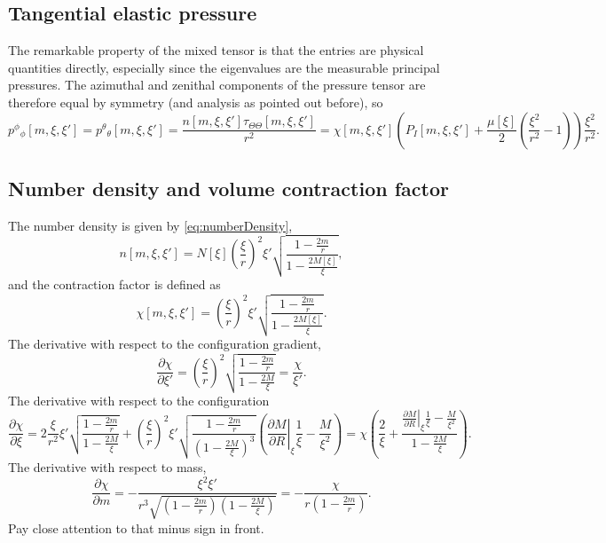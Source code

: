 \subsection{Tangential elastic pressure}
The remarkable property of the mixed tensor is that the entries are physical quantities directly, especially since the eigenvalues are the measurable principal pressures. The azimuthal and zenithal components of the pressure tensor are therefore equal by symmetry (and analysis as pointed out before), so
\begin{equation}
p^\phi{}_\phi[m,\xi,\xi'] = p^\theta{}_\theta[m,\xi,\xi'] = \frac{n[m,\xi,\xi']\tau_{\Theta\Theta}[m,\xi,\xi']}{r^2} = \chi[m,\xi,\xi']\left(P_I[m,\xi,\xi'] + \frac{\mu[\xi]}{2} \left(\frac{\xi^2}{r^2} - 1\right) \right) \frac{\xi^2}{r^2}.
\label{eq:tangentialPressureExpanded}
\end{equation}

\subsection{Number density and volume contraction factor}
The number density is given by \eqref{eq:numberDensity},
\begin{equation}
n[m,\xi,\xi'] = N[\xi]\left(\frac{\xi}{r}\right)^2\xi'\sqrt{\frac{1-\frac{2m}{r}}{1-\frac{2M[\xi]}{\xi}}},
\label{eq:numberDensityExpanded}
\end{equation}
and the contraction factor is defined as
\begin{equation}
\chi[m,\xi,\xi'] = \left(\frac{\xi}{r}\right)^2\xi'\sqrt{\frac{1-\frac{2m}{r}}{1-\frac{2M[\xi]}{\xi}}}.
\label{eq:contractionFactorExpanded}
\end{equation}
The derivative with respect to the configuration gradient,
\begin{equation}
\frac{\partial \chi}{\partial \xi'} = \left(\frac{\xi}{r}\right)^2\sqrt{\frac{1-\frac{2m}{r}}{1-\frac{2M}{\xi}}} = \frac{\chi}{\xi'}.
\label{eq:dcontractionFactor:dxi}
\end{equation}
The derivative with respect to the configuration
\begin{equation}
\frac{\partial \chi}{\partial \xi} =  2\frac{\xi}{r^2}\xi'\sqrt{\frac{1-\frac{2m}{r}}{1-\frac{2M}{\xi}}} + \left(\frac{\xi}{r}\right)^2\xi'\sqrt{\frac{1-\frac{2m}{r}}{\left(1-\frac{2M}{\xi}\right)^3}} \left(\left.\frac{\partial M}{\partial R}\right|_\xi\frac{1}{\xi} - \frac{M}{\xi^2}\right) = \chi\left(\frac{2}{\xi} + \frac{\left.\frac{\partial M}{\partial R}\right|_\xi\frac{1}{\xi} - \frac{M}{\xi^2}}{1 - \frac{2M}{\xi}}\right).
\label{eq:dcontractionFactor:xi}
\end{equation}
The derivative with respect to mass,
\begin{equation}
\frac{\partial \chi}{\partial m} = -\frac{\xi^2\xi'}{r^3\sqrt{\left(1-\frac{2m}{r}\right) \left(1-\frac{2M}{\xi}\right)}} = -\frac{\chi}{r\left(1 - \frac{2m}{r}\right)}.
\label{eq:dcontractionFactor:m}
\end{equation}
Pay close attention to that minus sign in front.

